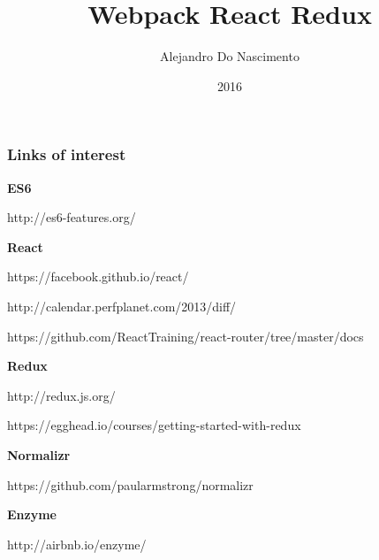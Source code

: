 \documentclass{beamer}
\title{Webpack React Redux}
\author{Alejandro Do Nascimento}
\date{2016}
\begin{document}
\frame{\titlepage}







\begin{frame}

  \frametitle{Links of interest}
  \begin{footnotesize}
    \textbf{ES6}

    http://es6-features.org/

    \textbf{React}

    https://facebook.github.io/react/

    http://calendar.perfplanet.com/2013/diff/

    https://github.com/ReactTraining/react-router/tree/master/docs

    \textbf{Redux}

    http://redux.js.org/

    https://egghead.io/courses/getting-started-with-redux

    \textbf{Normalizr}

    https://github.com/paularmstrong/normalizr

    \textbf{Enzyme}

    http://airbnb.io/enzyme/
  \end{footnotesize}
\end{frame}
\end{document}
